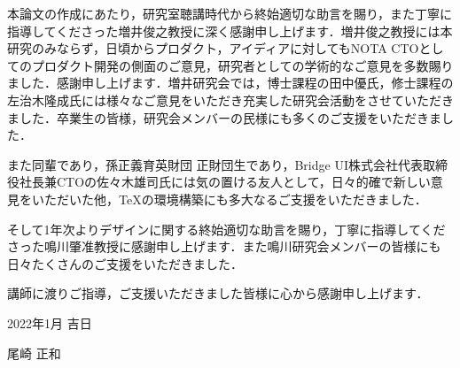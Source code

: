 \begin{acknowledgment}

本論文の作成にあたり，研究室聴講時代から終始適切な助言を賜り，また丁寧に指導してくださった増井俊之教授に深く感謝申し上げます．増井俊之教授には本研究のみならず，日頃からプロダクト，アイディアに対してもNOTA CTOとしてのプロダクト開発の側面のご意見，研究者としての学術的なご意見を多数賜りました．感謝申し上げます．増井研究会では，博士課程の田中優氏，修士課程の左治木隆成氏には様々なご意見をいただき充実した研究会活動をさせていただきました．卒業生の皆様，研究会メンバーの民様にも多くのご支援をいただきました．

また同輩であり，孫正義育英財団\cite{eeg} 正財団生であり，Bridge UI株式会社代表取締役社長兼CTOの佐々木雄司氏には気の置ける友人として，日々的確で新しい意見をいただいた他，\TeX の環境構築にも多大なるご支援をいただきました．

そして1年次よりデザインに関する終始適切な助言を賜り，丁寧に指導してくださった鳴川肇准教授に感謝申し上げます．また鳴川研究会メンバーの皆様にも日々たくさんのご支援をいただきました．

講師に渡りご指導，ご支援いただきました皆様に心から感謝申し上げます．
\begin{flushright}
2022年1月 吉日

尾崎 正和
\end{flushright}
\end{acknowledgment}
